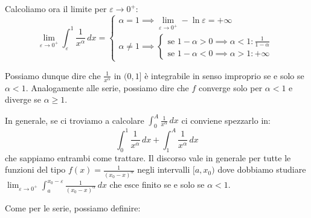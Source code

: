 \documentclass[12pt]{report}
\begin{document}
	Calcoliamo ora il limite per $\varepsilon \to 0^+$:
	\[
	\lim_{\varepsilon \to 0^+} \int_{\varepsilon}^{1} \frac{1}{x^\alpha} \, dx = 
	\begin{cases}
		\alpha = 1 \implies \lim_{\varepsilon \to 0^+} -\ln\varepsilon = +\infty \\
		\alpha \neq 1 \implies 
		\begin{cases}
			\text{se } 1 - \alpha > 0 \implies \alpha < 1 : \frac{1}{1-\alpha} \\
			\text{se } 1 - \alpha < 0 \implies \alpha > 1 : +\infty
		\end{cases}
	\end{cases}
	\]
	
	Possiamo dunque dire che $\frac{1}{x^\alpha}$ in $(0, 1]$ è integrabile in senso improprio se e solo se $\alpha < 1$.
	Analogamente alle serie, possiamo dire che $f$ converge solo per $\alpha < 1$ e diverge se $\alpha \ge 1$.
	
	In generale, se ci troviamo a calcolare $\int_{0}^{A} \frac{1}{x^\alpha} \, dx$ ci conviene spezzarlo in:
	\[
	\int_{0}^{1} \frac{1}{x^\alpha} \, dx + \int_{1}^{A} \frac{1}{x^\alpha} \, dx
	\]
	che sappiamo entrambi come trattare.
	Il discorso vale in generale per tutte le funzioni del tipo $f(x) = \frac{1}{(x_0 - x)^\alpha}$ negli intervalli $[a, x_0)$ dove dobbiamo studiare $\lim_{\varepsilon \to 0^+} \int_{a}^{x_0 - \varepsilon} \frac{1}{(x_0 - x)^\alpha} \, dx$ che esce finito se e solo se $\alpha < 1$.
	
	Come per le serie, possiamo definire:
	
\end{document}
